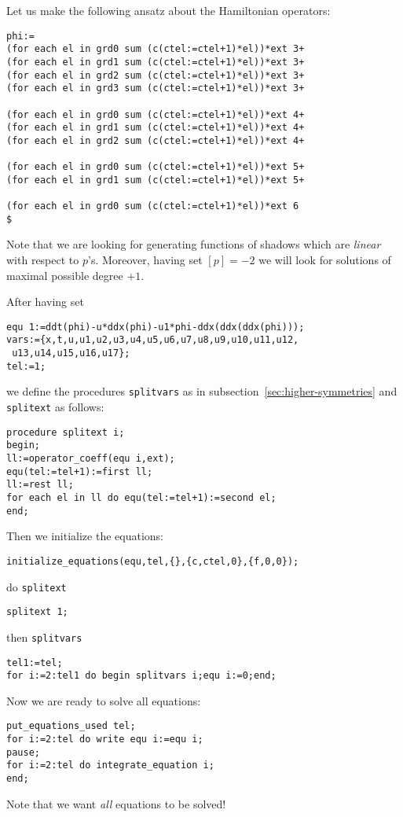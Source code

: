 Let us make the following ansatz about the Hamiltonian operators:
\begin{verbatim}
phi:=
(for each el in grd0 sum (c(ctel:=ctel+1)*el))*ext 3+
(for each el in grd1 sum (c(ctel:=ctel+1)*el))*ext 3+
(for each el in grd2 sum (c(ctel:=ctel+1)*el))*ext 3+
(for each el in grd3 sum (c(ctel:=ctel+1)*el))*ext 3+

(for each el in grd0 sum (c(ctel:=ctel+1)*el))*ext 4+
(for each el in grd1 sum (c(ctel:=ctel+1)*el))*ext 4+
(for each el in grd2 sum (c(ctel:=ctel+1)*el))*ext 4+

(for each el in grd0 sum (c(ctel:=ctel+1)*el))*ext 5+
(for each el in grd1 sum (c(ctel:=ctel+1)*el))*ext 5+

(for each el in grd0 sum (c(ctel:=ctel+1)*el))*ext 6
$
\end{verbatim}
Note that we are looking for generating functions of shadows which are
\emph{linear} with respect to $p$'s. Moreover, having set $[p]=-2$ we will look
for solutions of maximal possible degree $+1$.

After having set
\begin{verbatim}
equ 1:=ddt(phi)-u*ddx(phi)-u1*phi-ddx(ddx(ddx(phi)));
vars:={x,t,u,u1,u2,u3,u4,u5,u6,u7,u8,u9,u10,u11,u12,
 u13,u14,u15,u16,u17};
tel:=1;
\end{verbatim}
we define the procedures \texttt{splitvars} as in
subsection~\ref{sec:higher-symmetries} and \texttt{splitext} as follows:
\begin{verbatim}
procedure splitext i;
begin;
ll:=operator_coeff(equ i,ext);
equ(tel:=tel+1):=first ll;
ll:=rest ll;
for each el in ll do equ(tel:=tel+1):=second el;
end;
\end{verbatim}
Then we initialize the equations:
\begin{verbatim}
initialize_equations(equ,tel,{},{c,ctel,0},{f,0,0});
\end{verbatim}
do \texttt{splitext}
\begin{verbatim}
splitext 1;
\end{verbatim}
then \texttt{splitvars}
\begin{verbatim}
tel1:=tel;
for i:=2:tel1 do begin splitvars i;equ i:=0;end;
\end{verbatim}
Now we are ready to solve all equations:
\begin{verbatim}
put_equations_used tel;
for i:=2:tel do write equ i:=equ i;
pause;
for i:=2:tel do integrate_equation i;
end;
\end{verbatim}
Note that we want \emph{all} equations to be solved!

